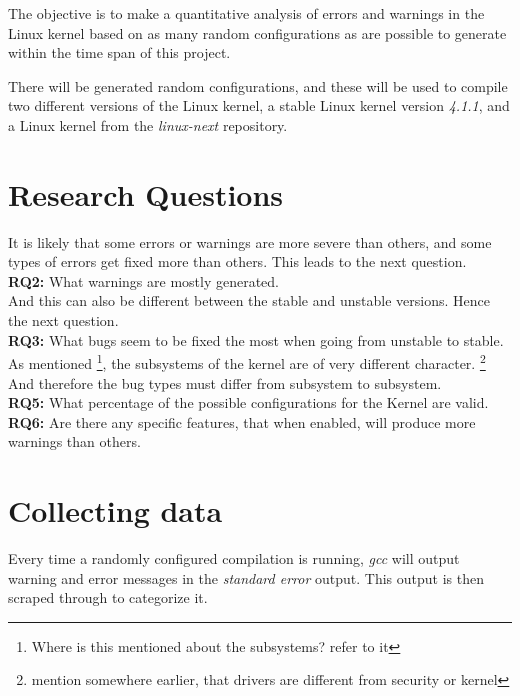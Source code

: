 \documentclass[a4paper,11pt]{report}
\begin{document}
The objective is to make a quantitative analysis of errors and warnings in the 
Linux kernel based on as many random configurations as are possible to generate 
within the time span of this project.

There will be generated random configurations, and these will be used to 
compile two different versions of the Linux kernel, a stable Linux kernel 
version \emph{4.1.1}, and a Linux kernel from the \emph{linux-next} repository.


\section{Research Questions}


It is likely that some errors or warnings are more severe than others, and some 
types of errors get fixed more than others. This leads to the next question.
\\


\textbf{RQ2:} What warnings are mostly generated.  
\\


And this can also be different between the stable and unstable versions. Hence 
the next question. 
\\


\textbf{RQ3:} What bugs seem to be fixed the most when going from unstable to 
stable. 
\\


As mentioned \footnote{Where is this mentioned about the subsystems? refer to 
it}, the subsystems of the kernel are of very different character. 
\footnote{mention somewhere earlier, that drivers are different from security 
or kernel} And therefore the bug types must differ from subsystem to subsystem. 
\\




\textbf{RQ5:} What percentage of the possible configurations for the Kernel are 
valid. 
\\


\textbf{RQ6:} Are there any specific features, that when enabled, will produce 
more warnings than others. 
\\




\section{Collecting data}

Every time a randomly configured compilation is running, \emph{gcc} will 
output warning and error messages in the \emph{standard error} output. This 
output is then scraped through to categorize it.
\end{document}

